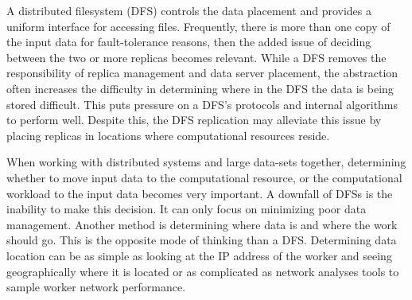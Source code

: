 \documentclass{rspublic}
\begin{document}
A distributed filesystem (DFS) controls the data placement and provides
a uniform interface for accessing files.  Frequently, there is more than
one copy of the input data for fault-tolerance reasons, then the added
issue of deciding between the two or more replicas becomes relevant.
While a DFS removes the responsibility of replica management and data
server placement, the abstraction often increases the difficulty in
determining where in the DFS the data is being stored difficult.  This
puts pressure on a DFS's protocols and internal algorithms to perform
well.  Despite this, the DFS replication may alleviate this issue by
placing replicas in locations where computational resources reside.

When working with distributed systems and large data-sets together,
determining whether to move input data to the computational resource, or
the computational workload to the input data becomes very important.  A
downfall of DFSs is the inability to make this decision.  It can only
focus on minimizing poor data management.  Another method is determining
where data is and where the work should go.  This is the opposite mode
of thinking than a DFS.  Determining data location can be as simple as
looking at the IP address of the worker and seeing geographically where
it is located or as complicated as network analyses tools to sample
worker network performance.


\end{document}
